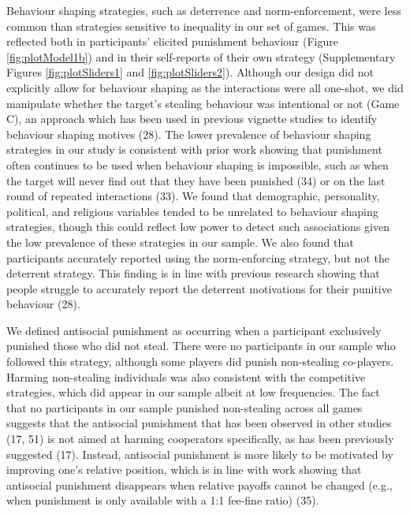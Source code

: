 \documentclass[
  man, donotrepeattitle,floatsintext]{apa6}
\begin{document}
Behaviour shaping strategies, such as deterrence and norm-enforcement, were less
common than strategies sensitive to inequality in our set of games. This was
reflected both in participants' elicited punishment behaviour (Figure
\ref{fig:plotModel1b}) and in their self-reports of their own strategy
(Supplementary Figures \ref{fig:plotSliders1} and \ref{fig:plotSliders2}).
Although our design did not explicitly allow for behaviour shaping as the
interactions were all one-shot, we did manipulate whether the target's stealing
behaviour was intentional or not (Game C), an approach which has been used in
previous vignette studies to identify behaviour shaping motives (28).
The lower prevalence of behaviour shaping strategies in our study is consistent
with prior work showing that punishment often continues to be used when
behaviour shaping is impossible, such as when the target will never find out
that they have been punished (34) or on the last round of repeated
interactions (33). We found that demographic, personality, political,
and religious variables tended to be unrelated to behaviour shaping strategies,
though this could reflect low power to detect such associations given the low
prevalence of these strategies in our sample. We also found that participants
accurately reported using the norm-enforcing strategy, but not the deterrent
strategy. This finding is in line with previous research showing that people
struggle to accurately report the deterrent motivations for their punitive
behaviour (28).

We defined antisocial punishment as occurring when a participant exclusively
punished those who did not steal. There were no participants in our sample who
followed this strategy, although some players did punish non-stealing
co-players. Harming non-stealing individuals was also consistent with the
competitive strategies, which did appear in our sample albeit at low frequencies.
The fact that no participants in our sample punished non-stealing across all
games suggests that the antisocial punishment that has been observed in other
studies (17, 51) is not aimed at harming cooperators
specifically, as has been previously suggested (17). Instead,
antisocial punishment is more likely to be motivated by improving one's
relative position, which is in line with work showing that antisocial punishment
disappears when relative payoffs cannot be changed (e.g., when punishment is
only available with a 1:1 fee-fine ratio) (35).
\end{document}

